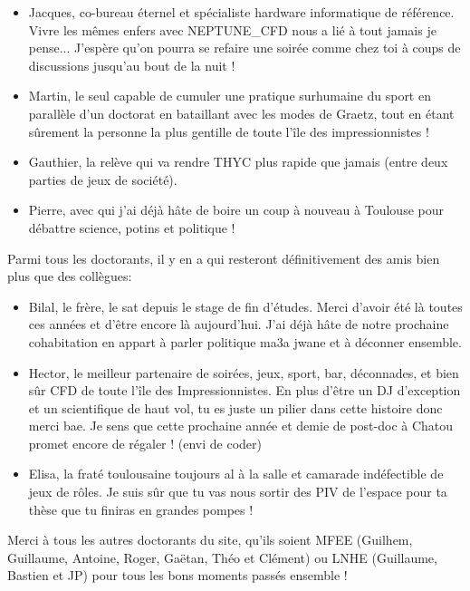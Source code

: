 \begin{itemize}
\item Jacques, co-bureau éternel et spécialiste hardware informatique de référence. Vivre les mêmes enfers avec NEPTUNE\_CFD nous a lié à tout jamais je pense... J'espère qu'on pourra se refaire une soirée comme chez toi à coups de discussions jusqu'au bout de la nuit !

\item Martin, le seul capable de cumuler une pratique surhumaine du sport en parallèle d'un doctorat en bataillant avec les modes de Graetz, tout en étant sûrement la personne la plus gentille de toute l'île des impressionnistes !

\item Gauthier, la relève qui va rendre THYC plus rapide que jamais  (entre deux parties de jeux de société). 

\item Pierre, avec qui j'ai déjà hâte de boire un coup à nouveau à Toulouse pour débattre science, potins et politique !
\end{itemize}

\npar

Parmi tous les doctorants, il y en a qui resteront définitivement des amis bien plus que des collègues:

\begin{itemize}
\item Bilal, le frère, le sat depuis le stage de fin d'études. Merci d'avoir été là toutes ces années et d'être encore là aujourd'hui. J'ai déjà hâte de notre prochaine cohabitation en appart à parler politique ma3a jwane et à déconner ensemble.

\item Hector, le meilleur partenaire de soirées, jeux, sport, bar, déconnades, et bien sûr CFD de toute l'île des Impressionnistes. En plus d'être un DJ d'exception et un scientifique de haut vol, tu es juste un pilier dans cette histoire donc merci bae. Je sens que cette prochaine année et demie de post-doc à Chatou promet encore de régaler ! (envi de coder)

\item Elisa, la fraté toulousaine toujours al à la salle et camarade indéfectible de jeux de rôles. Je suis sûr que tu vas nous sortir des PIV de l'espace pour ta thèse que tu finiras en grandes pompes ! 
\end{itemize}

\npar

Merci à tous les autres doctorants du site, qu'ils soient MFEE (Guilhem, Guillaume, Antoine, Roger, Gaëtan, Théo et Clément) ou LNHE (Guillaume, Bastien et JP) pour tous les bons moments passés ensemble !


